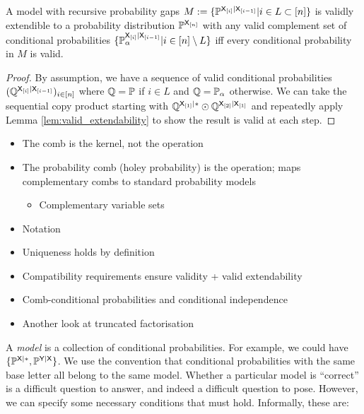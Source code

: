 \begin{lemma}
A model with recursive probability gaps $M:=\{\mathbb{P}^{\mathsf{X}_{[i]}|\mathsf{X}_{[i-1]}}|i\in L\subset [n]\}$ is validly extendible to a probability distribution $\mathbb{P}^{\mathsf{X}_{[n]}}$ with any valid complement set of conditional probabilities $\{\mathbb{P}_\alpha^{\mathsf{X}_{[i]}|\mathsf{X}_{[i-1]}}|i\in [n]\setminus L\}$ iff every conditional probability in $M$ is valid.
\end{lemma}

\begin{proof}
By assumption, we have a sequence of valid conditional probabilities $(\mathbb{Q}^{\mathsf{X}_{[i]}|\mathsf{X}_{[i-1]}})_{i\in [n]}$ where $\mathbb{Q}=\mathbb{P}$ if $i\in L$ and $\mathbb{Q}=\mathbb{P}_\alpha$ otherwise. We can take the sequential copy product starting with $\mathbb{Q}^{\mathsf{X}_{[1]}|*}\odot \mathbb{Q}^{\mathsf{X}_{[2]}|\mathsf{X}_{[1]}}$ and repeatedly apply Lemma \ref{lem:valid_extendability} to show the result is valid at each step.
\end{proof}

\begin{itemize}
	\item The comb is the kernel, not the operation
	\item The probability comb (holey probability) is the operation; maps complementary combs to standard probability models
	\begin{itemize}
		\item Complementary variable sets
	\end{itemize}
	\item Notation
	\item Uniqueness holds by definition
	\item Compatibility requirements ensure validity + valid extendability 
	\item Comb-conditional probabilities and conditional independence
	\item Another look at truncated factorisation
\end{itemize}

A \emph{model} is a collection of conditional probabilities. For example, we could have $\{\mathbb{P}^{\mathsf{X}|*},\mathbb{P}^{\mathsf{Y}|\mathsf{X}}\}$. We use the convention that conditional probabilities with the same base letter all belong to the same model. Whether a particular model is ``correct'' is a difficult question to answer, and indeed a difficult question to pose. However, we can specify some necessary conditions that must hold. Informally, these are:

